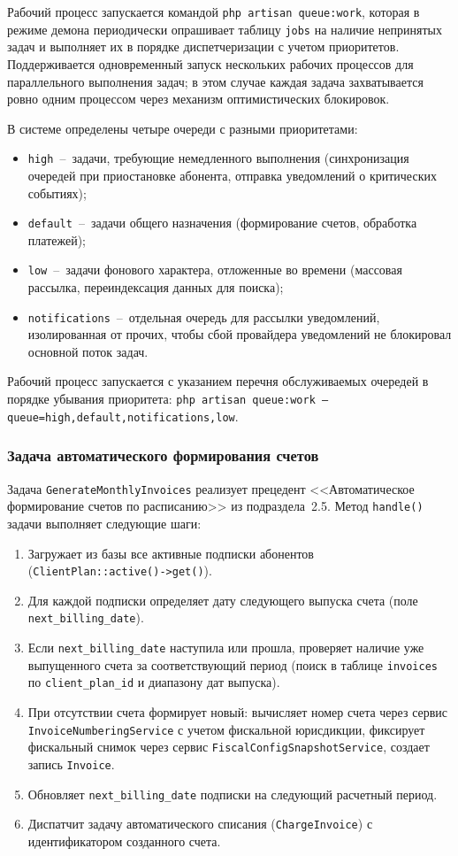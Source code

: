 Рабочий процесс запускается командой \texttt{php artisan queue:work}, которая в режиме демона периодически опрашивает таблицу \texttt{jobs} на наличие непринятых задач и выполняет их в порядке диспетчеризации с учетом приоритетов. Поддерживается одновременный запуск нескольких рабочих процессов для параллельного выполнения задач; в этом случае каждая задача захватывается ровно одним процессом через механизм оптимистических блокировок.

В системе определены четыре очереди с разными приоритетами:
\begin{itemize}
\item \texttt{high}~--~задачи, требующие немедленного выполнения (синхронизация очередей при приостановке абонента, отправка уведомлений о критических событиях);
\item \texttt{default}~--~задачи общего назначения (формирование счетов, обработка платежей);
\item \texttt{low}~--~задачи фонового характера, отложенные во времени (массовая рассылка, переиндексация данных для поиска);
\item \texttt{notifications}~--~отдельная очередь для рассылки уведомлений, изолированная от прочих, чтобы сбой провайдера уведомлений не блокировал основной поток задач.
\end{itemize}
Рабочий процесс запускается с указанием перечня обслуживаемых очередей в порядке убывания приоритета: \texttt{php artisan queue:work --queue=high,default,notifications,low}.

\subsubsection{Задача автоматического формирования счетов}

Задача \texttt{GenerateMonthlyInvoices} реализует прецедент <<Автоматическое формирование счетов по расписанию>> из подраздела~2.5. Метод \texttt{handle()} задачи выполняет следующие шаги:
\begin{enumerate}
\item Загружает из базы все активные подписки абонентов (\texttt{ClientPlan::active()->get()}).
\item Для каждой подписки определяет дату следующего выпуска счета (поле \texttt{next\_billing\_date}).
\item Если \texttt{next\_billing\_date} наступила или прошла, проверяет наличие уже выпущенного счета за соответствующий период (поиск в таблице \texttt{invoices} по \texttt{client\_plan\_id} и диапазону дат выпуска).
\item При отсутствии счета формирует новый: вычисляет номер счета через сервис \texttt{InvoiceNumberingService} с учетом фискальной юрисдикции, фиксирует фискальный снимок через сервис \texttt{FiscalConfigSnapshotService}, создает запись \texttt{Invoice}.
\item Обновляет \texttt{next\_billing\_date} подписки на следующий расчетный период.
\item Диспатчит задачу автоматического списания (\texttt{ChargeInvoice}) с идентификатором созданного счета.
\end{enumerate}

